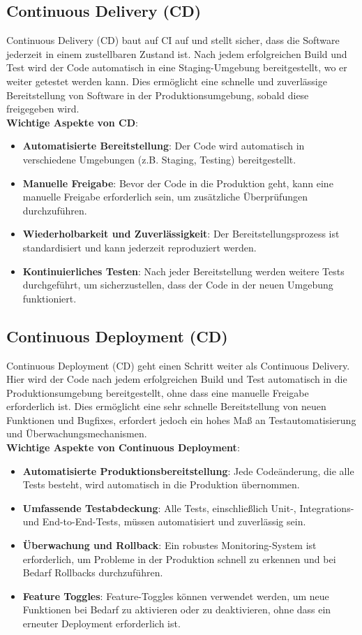\subsection{Continuous Delivery (CD)}
Continuous Delivery (CD) baut auf CI auf und stellt sicher, dass die Software jederzeit in einem zustellbaren Zustand ist. Nach jedem erfolgreichen Build und Test wird der Code automatisch in eine Staging-Umgebung bereitgestellt, wo er weiter getestet werden kann. Dies ermöglicht eine schnelle und zuverlässige Bereitstellung von Software in der Produktionsumgebung, sobald diese freigegeben wird.\\
\textbf{Wichtige Aspekte von CD}:
\begin{itemize}
    \item \textbf{Automatisierte Bereitstellung}: Der Code wird automatisch in verschiedene Umgebungen (z.B. Staging, Testing) bereitgestellt.
    \item \textbf{Manuelle Freigabe}: Bevor der Code in die Produktion geht, kann eine manuelle Freigabe erforderlich sein, um zusätzliche Überprüfungen durchzuführen.
    \item \textbf{Wiederholbarkeit und Zuverlässigkeit}: Der Bereitstellungsprozess ist standardisiert und kann jederzeit reproduziert werden.
    \item \textbf{Kontinuierliches Testen}: Nach jeder Bereitstellung werden weitere Tests durchgeführt, um sicherzustellen, dass der Code in der neuen Umgebung funktioniert.
\end{itemize}
\newpage
\subsection{Continuous Deployment (CD)}
Continuous Deployment (CD) geht einen Schritt weiter als Continuous Delivery. Hier wird der Code nach jedem erfolgreichen Build und Test automatisch in die Produktionsumgebung bereitgestellt, ohne dass eine manuelle Freigabe erforderlich ist. Dies ermöglicht eine sehr schnelle Bereitstellung von neuen Funktionen und Bugfixes, erfordert jedoch ein hohes Maß an Testautomatisierung und Überwachungsmechanismen.\\
\textbf{Wichtige Aspekte von Continuous Deployment}:
\begin{itemize}
    \item \textbf{Automatisierte Produktionsbereitstellung}: Jede Codeänderung, die alle Tests besteht, wird automatisch in die Produktion übernommen.
    \item \textbf{Umfassende Testabdeckung}: Alle Tests, einschließlich Unit-, Integrations- und End-to-End-Tests, müssen automatisiert und zuverlässig sein.
    \item \textbf{Überwachung und Rollback}: Ein robustes Monitoring-System ist erforderlich, um Probleme in der Produktion schnell zu erkennen und bei Bedarf Rollbacks durchzuführen.
    \item \textbf{Feature Toggles}: Feature-Toggles können verwendet werden, um neue Funktionen bei Bedarf zu aktivieren oder zu deaktivieren, ohne dass ein erneuter Deployment erforderlich ist.
\end{itemize}

